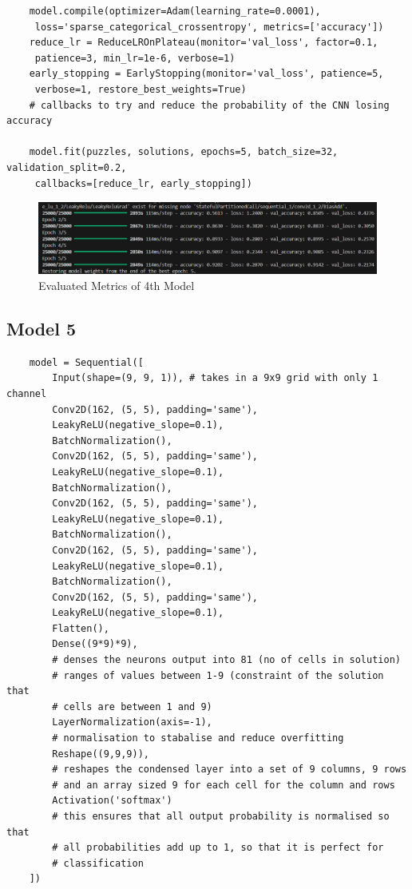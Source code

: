 \documentclass[]{final_report}
\begin{document}
\begin{verbatim}
    model.compile(optimizer=Adam(learning_rate=0.0001), 
     loss='sparse_categorical_crossentropy', metrics=['accuracy'])
    reduce_lr = ReduceLROnPlateau(monitor='val_loss', factor=0.1, 
     patience=3, min_lr=1e-6, verbose=1)
    early_stopping = EarlyStopping(monitor='val_loss', patience=5, 
     verbose=1, restore_best_weights=True)
    # callbacks to try and reduce the probability of the CNN losing accuracy

    model.fit(puzzles, solutions, epochs=5, batch_size=32, validation_split=0.2,
     callbacks=[reduce_lr, early_stopping])
\end{verbatim}

\begin{figure}[ht]
    \centering 
    \begin{minipage}{1.1\textwidth} 
        \includegraphics[width=\textwidth]{images/4th model metrics.png} 
        \caption{Evaluated Metrics of 4th Model}
        \label{fig: Evaluated Metrics of 4th Model} 
    \end{minipage} 
    \hfill 
\end{figure}

\subsection{Model 5}

\begin{verbatim}
    model = Sequential([
        Input(shape=(9, 9, 1)), # takes in a 9x9 grid with only 1 channel
        Conv2D(162, (5, 5), padding='same'),
        LeakyReLU(negative_slope=0.1),
        BatchNormalization(),
        Conv2D(162, (5, 5), padding='same'),
        LeakyReLU(negative_slope=0.1),
        BatchNormalization(),
        Conv2D(162, (5, 5), padding='same'),
        LeakyReLU(negative_slope=0.1),
        BatchNormalization(),
        Conv2D(162, (5, 5), padding='same'),
        LeakyReLU(negative_slope=0.1),
        BatchNormalization(),
        Conv2D(162, (5, 5), padding='same'),
        LeakyReLU(negative_slope=0.1),
        Flatten(),
        Dense((9*9)*9),
        # denses the neurons output into 81 (no of cells in solution) 
        # ranges of values between 1-9 (constraint of the solution that 
        # cells are between 1 and 9)
        LayerNormalization(axis=-1),
        # normalisation to stabalise and reduce overfitting
        Reshape((9,9,9)),
        # reshapes the condensed layer into a set of 9 columns, 9 rows 
        # and an array sized 9 for each cell for the column and rows
        Activation('softmax')
        # this ensures that all output probability is normalised so that 
        # all probabilities add up to 1, so that it is perfect for 
        # classification
    ])
\end{verbatim}
\end{document}

